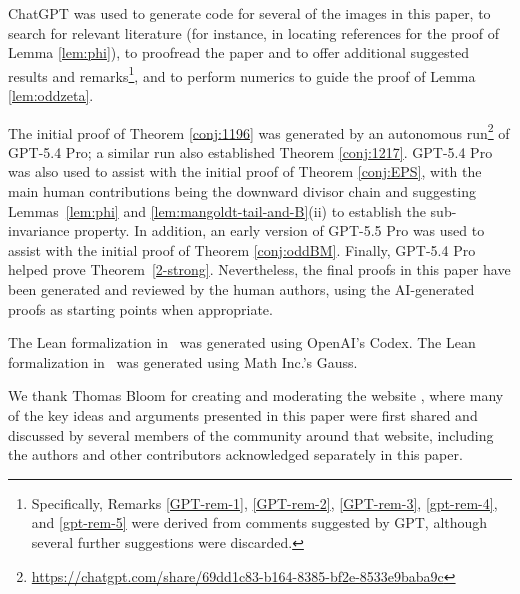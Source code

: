 \documentclass[12pt]{amsart}
\theoremstyle{definition}
\theoremstyle{remark}
\numberwithin{equation}{section}
\newcommand{\1}{{\mathbf 1}}
\begin{document}
ChatGPT was used to generate code for several of the images in this paper, to search for relevant literature (for instance, in locating references for the proof of Lemma \ref{lem:phi}), to proofread the paper and to offer additional suggested results and remarks\footnote{Specifically, Remarks \ref{GPT-rem-1}, \ref{GPT-rem-2}, \ref{GPT-rem-3}, \ref{gpt-rem-4}, and \ref{gpt-rem-5} were derived from comments suggested by GPT, although several further suggestions were discarded.}, and to perform numerics to guide the proof of Lemma \ref{lem:oddzeta}.  

The initial proof of Theorem \ref{conj:1196} was generated by an autonomous run\footnote{\url{https://chatgpt.com/share/69dd1c83-b164-8385-bf2e-8533e9baba9c}} of GPT-5.4 Pro; a similar run also established Theorem \ref{conj:1217}.  GPT-5.4 Pro was also used to assist with the initial proof of Theorem \ref{conj:EPS}, with the main human contributions being the downward divisor chain and suggesting Lemmas~\ref{lem:phi} and \ref{lem:mangoldt-tail-and-B}(ii) to establish the sub-invariance property. In addition, an early version of GPT-5.5 Pro was used to assist with the initial proof of Theorem \ref{conj:oddBM}. Finally, GPT-5.4 Pro helped prove Theorem~\ref{2-strong}. Nevertheless, the final proofs in this paper have been generated and reviewed by the human authors, using the AI-generated proofs as starting points when appropriate.

The Lean formalization in~\cite{lean-erdos164} was generated using OpenAI's Codex.
The Lean formalization in~\cite{lean-erdos1196} was generated using Math Inc.'s Gauss.

We thank Thomas Bloom for creating and moderating the website \cite{bloom}, where many of the key ideas and arguments presented in this paper were first shared and discussed by several members of the community around that website, including the authors and other contributors acknowledged separately in this paper.
\end{document}
